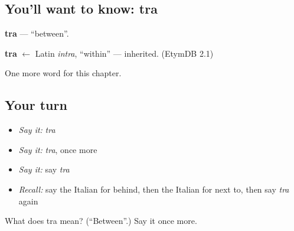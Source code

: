 \subsection*{You'll want to know: tra}
\textbf{tra} — \textquotedblleft{}between\textquotedblright{}.

\begin{cousinweb}
\textbf{tra} $\leftarrow$ Latin \emph{intra}, \textquotedblleft{}within\textquotedblright{} — inherited. (EtymDB 2.1)
\end{cousinweb}

\begin{grammarlens}[title={What you've built}]
One more word for this chapter.
\end{grammarlens}

\subsection*{Your turn}
\begin{itemize}
\raggedright
  \item \emph{Say it:} \emph{tra}
  \item \emph{Say it:} \emph{tra}, once more
  \item \emph{Say it:} say \emph{tra}
  \item \emph{Recall:} say the Italian for behind, then the Italian for next to, then say \emph{tra} again
\end{itemize}

\begin{tcolorbox}[breakable,colback=teal!4,colframe=teal!35!black,title={Before you move on}]
What does tra mean? (\textquotedblleft{}Between\textquotedblright{}.) Say it once more.
\end{tcolorbox}
